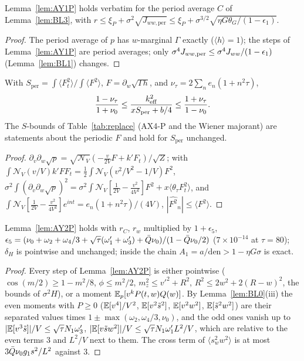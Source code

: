 \begin{lemma} \proofst
\label{lem:BL4}
Lemma~\ref{lem:AY1P} holds verbatim for the period average $C$ of Lemma~\ref{lem:BL3}, with $r\le\xi_P+\sigma^2\sqrt{J_{ww,\mathrm{per}}}\le
\xi_P+\sigma^{3/2}\sqrt{\eta G\theta_G/(1-\epsilon_1)}$.
\end{lemma}
\begin{proof}
The period average of $p$ has $w$-marginal $\Gamma$ exactly ($\langle h\rangle=1$); the steps of Lemma~\ref{lem:AY1P} are period averages; only
$\sigma^4J_{ww,\mathrm{per}}\le\sigma^4J_{ww}/(1-\epsilon_1)$ (Lemma~\ref{lem:BL1}) changes.
\end{proof}

\begin{lemma} \proofst
\label{lem:BL5}
With $S_{\mathrm{per}}=\int\langle F_t^2\rangle/\int\langle F^2\rangle$, $F=\partial_w\sqrt{\Gamma h}$, and $\nu_\tau=2\sum_ne_n(1+n^2\tau)$,
\begin{equation}
\frac{1-\nu_\tau}{1+\nu_0}\le\frac{k_{\mathrm{eff}}^2}{xS_{\mathrm{per}}+b/4}\le\frac{1+\nu_\tau}{1-\nu_0}.
\end{equation}
The $S$-bounds of Table~\ref{tab:replace} (AX4-P and the Wiener majorant) are statements about the periodic $F$ and hold for $S_{\mathrm{per}}$ unchanged.
\end{lemma}
\begin{proof}
$\partial_v\partial_w\sqrt p=\sqrt{\mathcal N_V}(-\tfrac v{2V}F+k'F_t)/\sqrt Z$; with $\int\mathcal N_V(v/V)k'FF_t=\tfrac12\int\mathcal N_V(v^2/V^2-1/V)F^2$,
$\sigma^2\int(\partial_v\partial_w\sqrt p)^2=\sigma^2\int\mathcal N_V[\tfrac1{2V}-\tfrac{v^2}{4V^2}]F^2+x\langle\theta_\tau F_t^2\rangle$, and
$\int\mathcal N_V[\tfrac1{2V}-\tfrac{v^2}{4V^2}]e^{int}=e_n(1+n^2\tau)/(4V)$, $|\widehat{F^2}_n|\le\langle F^2\rangle$.
\end{proof}

\begin{lemma} \proofst
\label{lem:BL6}
Lemma~\ref{lem:AY2P} holds with $r_C$, $r_w$ multiplied by $1+\epsilon_5$,
$\epsilon_5=(\nu_0+\omega_2+\omega_4/3+\sqrt\tau(\omega'_1+\omega'_3)+\bar Q\nu_0)/(1-\bar Q\nu_0/2)$ ($7\times10^{-14}$ at $\tau=80$); $\delta_H$ is pointwise and unchanged;
inside the chain $A_1=a/\mathrm{den}>1-\eta G\sigma$ is exact.
\end{lemma}
\begin{proof}
Every step of Lemma~\ref{lem:AY2P} is either pointwise ($\cos(m/2)\ge1-m^2/8$, $\phi\le m^2/2$, $m_z^2\le v'^2+R^2$, $R^2\le2w^2+2(R-w)^2$, the bounds of
$\sigma^2H$), or a moment $\mathbb{E}_p[v^kP(t,w)Q(w)]$. By Lemma~\ref{lem:BL0}(iii) the even moments with $P\ge0$ ($\mathbb{E}[v^4]/V^2$, $\mathbb{E}[v^2\tilde s^2]$, $\mathbb{E}[v^2w^2]$,
$\mathbb{E}[\tilde s^2w^2]$) are their separated values times $1\pm\max(\omega_2,\omega_4/3,\nu_0)$, and the odd ones vanish up to
$|\mathbb{E}[v^3\tilde s]|/V\le\sqrt\tau N_1\omega'_3$, $|\mathbb{E}[v\tilde sw^2]|/V\le\sqrt\tau N_1\omega'_1L^2/V$, which are relative to the even terms $3$ and $L^2/V$
next to them. The cross term of $\langle s_w^2w^2\rangle$ is at most $3\bar Q\nu_0g_1s^2/L^2$ against $3$.
\end{proof}

